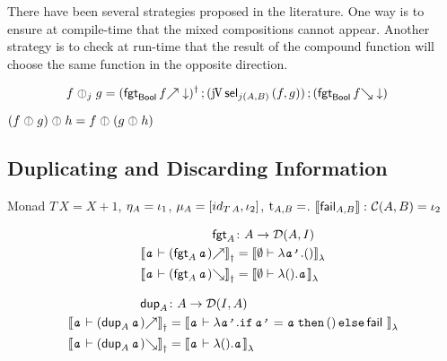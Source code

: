 \documentclass[runningheads,envcountsame]{llncs}
\begin{document}
    There have been several strategies proposed in the literature. One way is to ensure at compile-time that the mixed compositions cannot appear. Another strategy is to check at run-time that the result of the compound function will choose the same function in the opposite direction.
    
    \begin{align*}
        f \orelse_j g &= \comp{\rev{(\eapp{\forget_{\tbool}}{\f{f}\downarrow})}}{\comp{(\juncurry\,\eapp{\select_{\homJ{A}{j}{B}}}{\epair{f}{g}})}{(\eapp{\forget_{\tbool}}{\b{f}\downarrow})}}
    \end{align*}
    
    \begin{lemma}
        $(f \orelse g) \orelse h = f \orelse (g \orelse h)$
    \end{lemma}
    
    \subsection{Duplicating and Discarding Information}
    
    \begin{definition}
        Monad $T\,X = X + 1$, $\munit_A = \iota_1$, $\mjoin_A = [id_{T\,A}, \iota_2]$, $\mathrm{t}_{A, B} = $.
        $\sem{\efail_{A, B}}\colon \homC{A}{B} = \iota_2$
    \end{definition}
    
    \begin{align*}
        \forget_A &\colon A \to \homD{A}{I} \\
        \semD{\evar{a} \vdash \f{(\eapp{\forget_A}{\evar{a}})}} &= \semL{\emptyset \vdash \elam{\evar{a'}}{\eunit}} \\
        \semD{\evar{a} \vdash \b{(\eapp{\forget_A}{\evar{a}})}} &= \semL{\emptyset \vdash \elam{\eunit}{\evar{a}}}
    \end{align*}
    
    \begin{align*}
        \duplicate_A &\colon A \to \homD{I}{A} \\
        \semD{\evar{a} \vdash \f{(\duplicate_A\,\evar{a})}} &= \semL{\evar{a} \vdash \elam{\evar{a'}}{\eapp{\eapp{\eifthenelse{\evar{a'} = \evar{a}}{\eunit}{\efail}}}}} \\
        \semD{\evar{a} \vdash \b{(\duplicate_A\,\evar{a})}} &= \semL{\evar{a} \vdash \elam{\eunit}{\evar{a}}}
    \end{align*}
    
\end{document}
